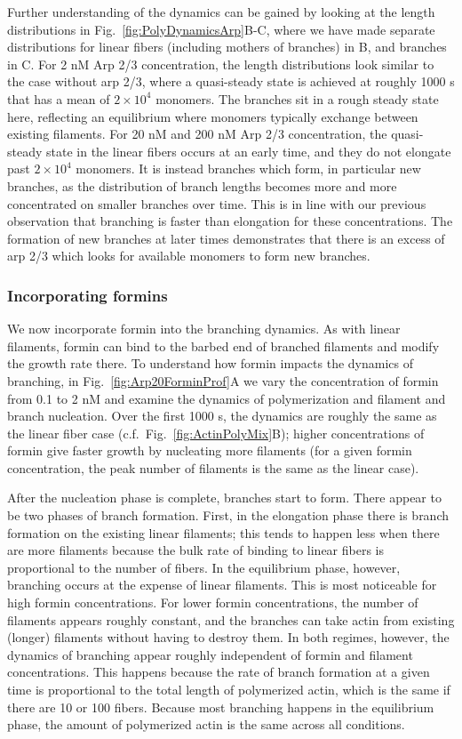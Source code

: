 \documentclass[11pt]{article}
\begin{document}
Further understanding of the dynamics can be gained by looking at the length distributions in Fig.\ \ref{fig:PolyDynamicsArp}B-C, where we have made separate distributions for linear fibers (including mothers of branches) in B, and branches in C. For 2 nM Arp 2/3 concentration, the length distributions look similar to the case without arp 2/3, where a quasi-steady state is achieved at roughly 1000 s that has a mean of $2 \times 10^4$ monomers. The branches sit in a rough steady state here, reflecting an equilibrium where monomers typically exchange between existing filaments. For 20 nM and 200 nM Arp 2/3 concentration, the quasi-steady state in the linear fibers occurs at an early time, and they do not elongate past $2 \times 10^4$ monomers. It is instead branches which form, in particular new branches, as the distribution of branch lengths becomes more and more concentrated on smaller branches over time. This is in line with our previous observation that branching is faster than elongation for these concentrations. The formation of new branches at later times demonstrates that there is an excess of arp 2/3 which looks for available monomers to form new branches. 

\subsubsection{Incorporating formins}
We now incorporate formin into the branching dynamics. As with linear filaments, formin can bind to the barbed end of branched filaments and modify the growth rate there. To understand how formin impacts the dynamics of branching, in Fig.\ \ref{fig:Arp20ForminProf}A we vary the concentration of formin from 0.1 to 2 nM and examine the dynamics of polymerization and filament and branch nucleation. Over the first 1000 s, the dynamics are roughly the same as the linear fiber case (c.f.\ Fig.\ \ref{fig:ActinPolyMix}B); higher concentrations of formin give faster growth by nucleating more filaments (for a given formin concentration, the peak number of filaments is the same as the linear case). 

After the nucleation phase is complete, branches start to form. There appear to be two phases of branch formation. First, in the elongation phase there is branch formation on the existing linear filaments; this tends to happen less when there are more filaments because the bulk rate of binding to linear fibers is proportional to the number of fibers. In the equilibrium phase, however, branching occurs at the expense of linear filaments. This is most noticeable for high formin concentrations. For lower formin concentrations, the number of filaments appears roughly constant, and the branches can take actin from existing (longer) filaments without having to destroy them. In both regimes, however, the dynamics of branching appear roughly independent of formin and filament concentrations. This happens because the rate of branch formation at a given time is proportional to the total length of polymerized actin, which is the same if there are 10 or 100 fibers. Because most branching happens in the equilibrium phase, the amount of polymerized actin is the same across all conditions. 
\end{document}
